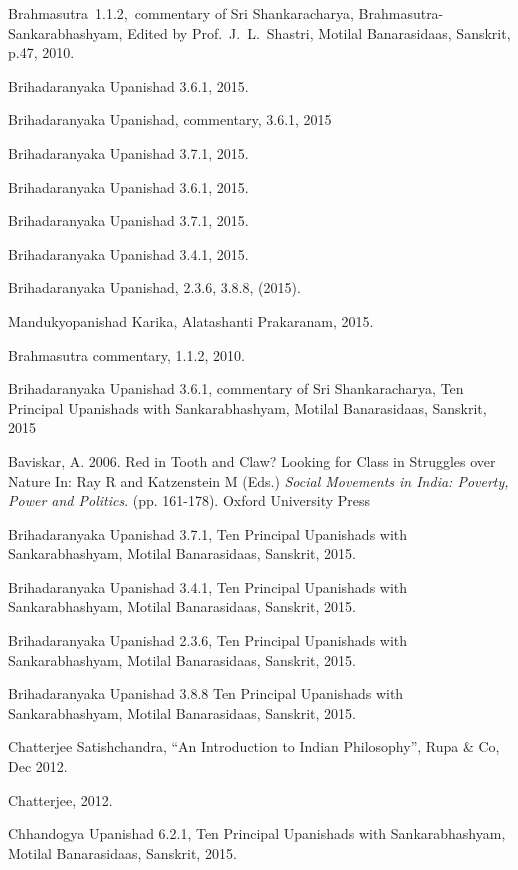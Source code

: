 \documentclass[twoside, 13pt]{article}
\begin{document}
{{{\begin{thebibliography}{99}

\bibitem{} Brahmasutra~1.1.2,~commentary of Sri Shankaracharya, Brahmasutra-Sankarabha\break shyam, Edited by Prof.~J.~L.~Shastri, Motilal Banarasidaas, Sanskrit, p.47, 2010.

\bibitem{} Brihadaranyaka Upanishad 3.6.1, 2015.

\bibitem{} Brihadaranyaka Upanishad, commentary, 3.6.1, 2015

\bibitem{} Brihadaranyaka Upanishad 3.7.1, 2015.

\bibitem{} Brihadaranyaka Upanishad 3.6.1, 2015.

\bibitem{} Brihadaranyaka Upanishad 3.7.1, 2015.

\bibitem{} Brihadaranyaka Upanishad 3.4.1, 2015.

\bibitem{} Brihadaranyaka Upanishad, 2.3.6, 3.8.8, (2015).

\bibitem{} Mandukyopanishad Karika, Alatashanti Prakaranam, 2015.

\bibitem{} Brahmasutra commentary, 1.1.2, 2010.

\bibitem{} Brihadaranyaka Upanishad 3.6.1, commentary of Sri Shankaracharya, Ten Principal Upanishads with Sankarabhashyam, Motilal Banarasidaas, Sanskrit, 2015

\bibitem{} Baviskar, A. 2006. Red in Tooth and Claw? Looking for Class in Struggles over Nature In: Ray R and Katzenstein M (Eds.) \textit{Social Movements in India: Poverty, Power and Politics}. (pp. 161-178). Oxford University Press

\bibitem{}Brihadaranyaka Upanishad 3.7.1, Ten Principal Upanishads with Sankarabhashyam, Motilal Banarasidaas, Sanskrit, 2015.

\bibitem{} Brihadaranyaka Upanishad 3.4.1, Ten Principal Upanishads with Sankarabhashyam, Motilal Banarasidaas, Sanskrit, 2015.

\bibitem{} Brihadaranyaka Upanishad 2.3.6, Ten Principal Upanishads with Sankarabhashyam, Motilal Banarasidaas, Sanskrit, 2015.

\bibitem{} Brihadaranyaka Upanishad 3.8.8 Ten Principal Upanishads with Sankarabhashyam, Motilal Banarasidaas, Sanskrit, 2015.

\bibitem{} Chatterjee Satishchandra, “An Introduction to Indian Philosophy”, Rupa \& Co, Dec 2012.

\bibitem{} Chatterjee, 2012.

\bibitem{} Chhandogya Upanishad 6.2.1, Ten Principal Upanishads with Sankarabhashyam, Motilal Banarasidaas, Sanskrit, 2015.


\end{thebibliography}}}}
\end{document}
